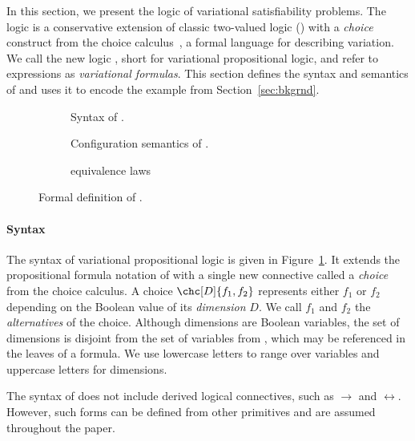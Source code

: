 \label{sec:vlogic}

In this section, we present the logic of variational satisfiability problems.
%
The logic is a conservative extension of classic two-valued logic (\pl{})
with a \emph{choice} construct from the choice
calculus~\cite{EW11tosem,Walk13thesis}, a formal language for describing
variation. We call the new logic \vpl{}, short for variational propositional
logic, and refer to \vpl{} expressions as \emph{variational formulas}.
%
This section defines the syntax and semantics of \vpl{} and uses it to encode
the example from Section~\ref{sec:bkgrnd}.


\begin{figure}
  \begin{subfigure}[t]{\linewidth}
    \centering
    
    \caption{Syntax of \vpl{}.}%
    \label{fig:cc:stx}
  \end{subfigure}
%
  \begin{subfigure}[t]{\linewidth}
    
    \centering
    \caption{Configuration semantics of \vpl{}.}%
    \label{fig:cc:cfg}
  \end{subfigure}
%
  \begin{subfigure}[t]{\linewidth}
    
    \centering
    \caption{\vpl{} equivalence laws}%
    \label{fig:cc:eqv}
  \end{subfigure}
\caption{Formal definition of \vpl{}.}%
\label{fig:cc}
\end{figure}
%

\paragraph{Syntax}
%
The syntax of variational propositional logic is given in
Figure~\ref{fig:cc:stx}. It extends the propositional formula notation of \pl{}
with a single new connective called a \emph{choice} from the choice calculus.
%
A choice $\chc[D]{f_1,f_2}$ represents either $f_1$ or $f_2$ depending on the
Boolean value of its \emph{dimension} $D$. We call $f_1$ and $f_2$ the
\emph{alternatives} of the choice.
%
Although dimensions are Boolean variables, the set of dimensions is disjoint
from the set of variables from \pl{}, which may be referenced in the leaves of
a formula. We use lowercase letters to range over variables and uppercase
letters for dimensions.

The syntax of \vpl{} does not include derived logical connectives, such as
$\rightarrow$ and $\leftrightarrow$. However, such forms can be defined
  from other primitives and are assumed throughout the paper.


